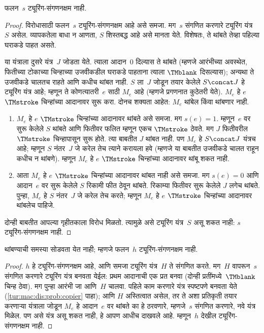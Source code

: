 \begin{lem}
फलन~$s$ ट्यूरिंग-संगणनक्षम नाही.
\end{lem}

\begin{proof}
विरोधासाठी फलन~$s$ ट्यूरिंग-संगणनक्षम आहे असे
समजा. मग~$s$ संगणित करणारे ट्यूरिंग यंत्र~$S$
असेल. व्यापकतेला बाधा न आणता, $S$ शिस्तबद्ध
आहे असे मानता येते. विशेषतः, ते थांबते
तेव्हा पहिल्या घराकडे पाहत असते.

या यंत्राला दुसरे यंत्र~$J$ जोडता येते.
त्याला आदान~$0$ दिल्यास ते थांबते
(म्हणजे आरंभीच्या अवस्थेत, फितीच्या टोकाच्या
चिन्हाच्या उजवीकडील घराकडे पाहताना त्याला
$\TMblank$ दिसल्यास); अन्यथा ते उजवीकडे
चालतच राहते आणि कधीच थांबत नाही.
$S$ ला~$J$ जोडून तयार केलेले
$S \concat J$ हे ट्यूरिंग यंत्र आहे;
म्हणून ते कोणत्यातरी~$e$ साठी $M_e$
आहे (म्हणजे प्रगणनात कुठेतरी येते).
$M_e$ हे $e$ $\TMstroke$ चिन्हांच्या
आदानावर सुरू करा. दोनच शक्यता आहेत:
$M_e$ थांबेल किंवा थांबणार नाही.
\begin{enumerate}
\item $M_e$ हे $e$ $\TMstroke$ चिन्हांच्या
  आदानावर थांबते असे समजा. मग $s(e)
  = 1$. म्हणून~$e$ वर सुरू केलेले $S$
  थांबते आणि फितीवर फलित म्हणून एकच
  $\TMstroke$ ठेवते. मग $J$ फितीवरील
  $\TMstroke$ चिन्हापासून सुरू होते. त्या
  बाबतीत $J$ थांबत नाही. पण $M_e$ हे
  $S \concat J$ यंत्रच आहे; म्हणून $S$
  नंतर~$J$ जे करेल तेच त्याने करायला
  हवे (म्हणजे या बाबतीत उजवीकडे चालत
  राहून कधीच न थांबणे). म्हणून $M_e$
  हे $e$ $\TMstroke$ चिन्हांच्या आदानावर
  थांबू शकत नाही.

\item आता $M_e$ हे $e$ $\TMstroke$
  चिन्हांच्या आदानावर थांबत नाही असे
  समजा. मग $s(e) = 0$ आणि आदान~$e$
  वर सुरू केलेले $S$ रिकामी फीत ठेवून
  थांबते. रिकाम्या फितीवर सुरू केलेले
  $J$ लगेच थांबते. पुन्हा, $M_e$ हे
  $S$ नंतर~$J$ जे करेल तेच करते;
  म्हणून $M_e$ हे $e$ $\TMstroke$
  चिन्हांच्या आदानावर थांबलेच पाहिजे.
\end{enumerate}
दोन्ही बाबतीत आपल्या गृहीतकाला विरोध
मिळतो. त्यामुळे असे ट्यूरिंग यंत्र~$S$
असू शकत नाही: $s$ ट्यूरिंग-संगणनक्षम नाही.
\end{proof}

\begin{thm}
\label{tur:und:hal:thm:halting-problem} थांबण्याची समस्या
सोडवता येत नाही; म्हणजे फलन~$h$
ट्यूरिंग-संगणनक्षम नाही.
\end{thm}

\begin{proof}
$h$ हे ट्यूरिंग-संगणनक्षम आहे, आणि समजा
ट्यूरिंग यंत्र~$H$ ते संगणित करते.
मग~$H$ वापरून~$s$ संगणित करणारे ट्यूरिंग
यंत्र बनवता येईल: प्रथम आदानाची एक प्रत
बनवा (दोन्ही प्रतींमध्ये~$\TMblank$ चिन्ह
ठेवा). मग पुन्हा आरंभी जा आणि~$H$
चालवा. पहिले काम करणारे यंत्र स्पष्टपणे
बनवता येते (\ref{tur:mac:dis:prob:copier}
पाहा); आणि $H$ अस्तित्वात असेल, तर
ते अशा प्रतिकृती तयार करणाऱ्या यंत्राला
जोडून $M_e$ हे आदान~$e$ वर थांबते
का हे ठरवणारे, म्हणजे~$s$ संगणित
करणारे, नवे यंत्र मिळेल. पण असे यंत्र
असू शकत नाही, हे आपण आधीच दाखवले
आहे. म्हणून~$h$ देखील ट्यूरिंग-संगणनक्षम
नाही.
\end{proof}

